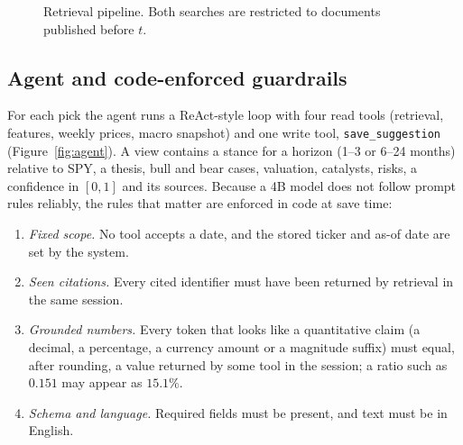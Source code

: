 \documentclass[preprint,11pt]{elsarticle}
\newcommand{\code}[1]{\texttt{#1}}
\begin{document}
\begin{figure}[t]
\centering
{}
\caption{Retrieval pipeline. Both searches are restricted to documents published before $t$.}
\label{fig:retrieval}
\end{figure}

\subsection{Agent and code-enforced guardrails}
\label{sec:agent}

For each pick the agent runs a ReAct-style loop \cite{yao2022react} with four read tools (retrieval,
features, weekly prices, macro snapshot) and one write tool, \code{save\_suggestion}
(Figure~\ref{fig:agent}). A view contains a stance for a horizon (1--3 or 6--24 months) relative to SPY, a
thesis, bull and bear cases, valuation, catalysts, risks, a confidence in $[0,1]$ and its sources. Because a
4B model does not follow prompt rules reliably, the rules that matter are enforced in code at save time:

\begin{enumerate}
  \item \emph{Fixed scope.} No tool accepts a date, and the stored ticker and as-of date are set by the system.
  \item \emph{Seen citations.} Every cited identifier must have been returned by retrieval in the same session.
  \item \emph{Grounded numbers.} Every token that looks like a quantitative claim (a decimal, a percentage, a
        currency amount or a magnitude suffix) must equal, after rounding, a value returned by some tool in the
        session; a ratio such as $0.151$ may appear as $15.1\%$.
  \item \emph{Schema and language.} Required fields must be present, and text must be in English.
\end{enumerate}
\end{document}
